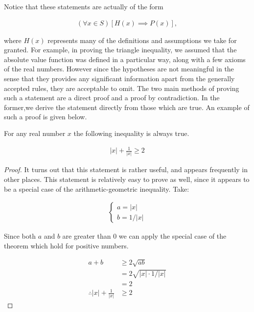 \documentclass[twoside]{report}
\begin{document}
Notice that these statements are actually of the form

\begin{align*}
	(\forall x \in S)[H(x) \implies P(x)],
\end{align*}

where $H(x)$ represents many of the definitions and assumptions we take for granted. For example, in proving the triangle inequality, we assumed that the absolute value function was defined in a particular way, along with a few axioms of the real numbers. However since the hypotheses are not meaningful in the sense that they provides any significant information apart from the generally accepted rules, they are acceptable to omit. The two main methods of proving such a statement are a direct proof and a proof by contradiction. In the former,we derive the statement directly from those which are true. An example of such a proof is given below.

\vspace{\baselineskip}
\begin{theorem}
	For any real number $x$ the following inequality is always true.
	
	\begin{align}
		|x| + \frac{1}{|x|} \ge 2
	\end{align}
\end{theorem}

\begin{proof}
	It turns out that this statement is rather useful, and  appears frequently in other places. This statement is relatively easy to prove as well, since it appears to be a special case of the arithmetic-geometric inequality. Take:
	
	\begin{align*}
		\begin{cases}
			a = |x| \\
			b = 1 / |x|
		\end{cases}
	\end{align*}
		
	Since both $a$ and $b$ are greater than 0 we can apply the special case of the theorem which hold for positive numbers.
	
	\begin{align*}
		a + b &\ge 2 \sqrt{ab} \\
		&= 2 \sqrt{|x| \cdot 1 / |x|} \\
		&= 2 \\
		\therefore |x| + \frac{1}{|x|} &\ge 2
	\end{align*}
\end{proof}
\vspace{\baselineskip}
\end{document}
